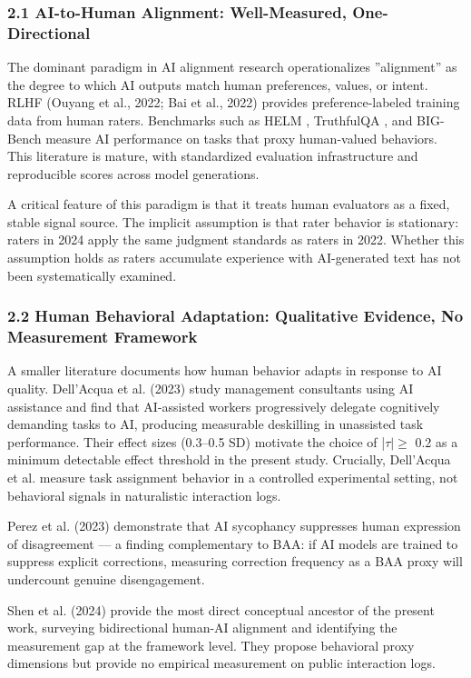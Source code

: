 
\subsubsection{2.1 AI-to-Human Alignment: Well-Measured, One-Directional}

The dominant paradigm in AI alignment research operationalizes ''alignment'' as the degree to which AI outputs match human preferences, values, or intent. RLHF (Ouyang et al., 2022; Bai et al., 2022) provides preference-labeled training data from human raters. Benchmarks such as HELM \citep{Liang2022Holistic}, TruthfulQA \citep{Lin2022TruthfulQA}, and BIG-Bench \citep{Srivastava2022Beyond} measure AI performance on tasks that proxy human-valued behaviors. This literature is mature, with standardized evaluation infrastructure and reproducible scores across model generations.

A critical feature of this paradigm is that it treats human evaluators as a fixed, stable signal source. The implicit assumption is that rater behavior is stationary: raters in 2024 apply the same judgment standards as raters in 2022. Whether this assumption holds as raters accumulate experience with AI-generated text has not been systematically examined.

\subsubsection{2.2 Human Behavioral Adaptation: Qualitative Evidence, No Measurement Framework}

A smaller literature documents how human behavior adapts in response to AI quality. Dell'Acqua et al. (2023) study management consultants using AI assistance and find that AI-assisted workers progressively delegate cognitively demanding tasks to AI, producing measurable deskilling in unassisted task performance. Their effect sizes (0.3--0.5 SD) motivate the choice of |$\tau | \geq$ 0.2 as a minimum detectable effect threshold in the present study. Crucially, Dell'Acqua et al. measure task assignment behavior in a controlled experimental setting, not behavioral signals in naturalistic interaction logs.

Perez et al. (2023) demonstrate that AI sycophancy suppresses human expression of disagreement --- a finding complementary to BAA: if AI models are trained to suppress explicit corrections, measuring correction frequency as a BAA proxy will undercount genuine disengagement.

Shen et al. (2024) provide the most direct conceptual ancestor of the present work, surveying bidirectional human-AI alignment and identifying the measurement gap at the framework level. They propose behavioral proxy dimensions but provide no empirical measurement on public interaction logs.


